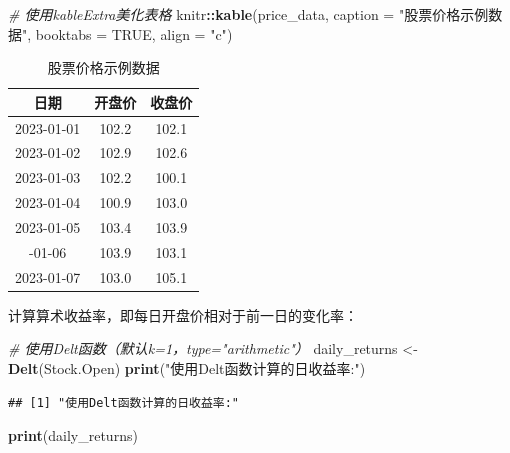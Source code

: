 \documentclass[]{ctexbook}
\newenvironment{Shaded}{\begin{snugshade}}{\end{snugshade}}
\newcommand{\AttributeTok}[1]{\textcolor[rgb]{0.13,0.29,0.53}{#1}}
\newcommand{\CommentTok}[1]{\textcolor[rgb]{0.56,0.35,0.01}{\textit{#1}}}
\newcommand{\ConstantTok}[1]{\textcolor[rgb]{0.56,0.35,0.01}{#1}}
\newcommand{\FunctionTok}[1]{\textcolor[rgb]{0.13,0.29,0.53}{\textbf{#1}}}
\newcommand{\NormalTok}[1]{#1}
\newcommand{\OtherTok}[1]{\textcolor[rgb]{0.56,0.35,0.01}{#1}}
\newcommand{\SpecialCharTok}[1]{\textcolor[rgb]{0.81,0.36,0.00}{\textbf{#1}}}
\newcommand{\StringTok}[1]{\textcolor[rgb]{0.31,0.60,0.02}{#1}}
\begin{document}
\begin{Shaded}
\begin{Highlighting}[]
\CommentTok{\# 使用kableExtra美化表格}
\NormalTok{knitr}\SpecialCharTok{::}\FunctionTok{kable}\NormalTok{(price\_data, }
             \AttributeTok{caption =} \StringTok{"股票价格示例数据"}\NormalTok{, }
             \AttributeTok{booktabs =} \ConstantTok{TRUE}\NormalTok{,}
             \AttributeTok{align =} \StringTok{"c"}\NormalTok{)}
\end{Highlighting}
\end{Shaded}

\begin{table}

\caption{\label{tab:pricedata}股票价格示例数据}
\centering
\begin{tabular}[t]{ccc}
\toprule
日期 & 开盘价 & 收盘价\\
\midrule
2023-01-01 & 102.2 & 102.1\\
2023-01-02 & 102.9 & 102.6\\
2023-01-03 & 102.2 & 100.1\\
2023-01-04 & 100.9 & 103.0\\
2023-01-05 & 103.4 & 103.9\\
\addlinespace
2023-01-06 & 103.9 & 103.1\\
2023-01-07 & 103.0 & 105.1\\
\bottomrule
\end{tabular}
\end{table}

计算算术收益率，即每日开盘价相对于前一日的变化率：

\begin{Shaded}
\begin{Highlighting}[]
\CommentTok{\# 使用Delt函数（默认k=1，type="arithmetic"）}
\NormalTok{daily\_returns }\OtherTok{\textless{}{-}} \FunctionTok{Delt}\NormalTok{(Stock.Open)}
\FunctionTok{print}\NormalTok{(}\StringTok{"使用Delt函数计算的日收益率:"}\NormalTok{)}
\end{Highlighting}
\end{Shaded}

\begin{verbatim}
## [1] "使用Delt函数计算的日收益率:"
\end{verbatim}

\begin{Shaded}
\begin{Highlighting}[]
\FunctionTok{print}\NormalTok{(daily\_returns)}
\end{Highlighting}
\end{Shaded}
\end{document}
